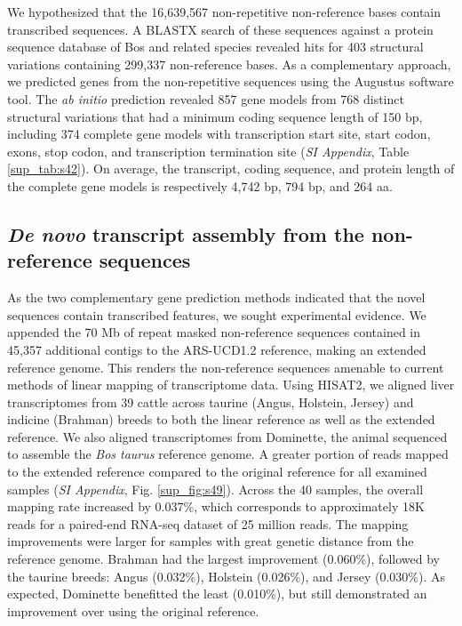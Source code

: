 \documentclass[../main.tex]{subfiles}
\begin{document}
We hypothesized that the 16,639,567 non-repetitive non-reference bases contain transcribed sequences. A BLASTX search of these sequences against a protein sequence database of Bos and related species revealed hits for 403 structural variations containing 299,337 non-reference bases. As a complementary approach, we predicted genes from the non-repetitive sequences using the Augustus software tool. The \emph{ab initio} prediction revealed 857 gene models from 768 distinct structural variations that had a minimum coding sequence length of 150 bp, including 374 complete gene models with transcription start site, start codon, exons, stop codon, and transcription termination site (\emph{SI Appendix}, Table \ref{sup_tab:s42}). On average, the transcript, coding sequence, and protein length of the complete gene models is respectively 4,742 bp, 794 bp, and 264 aa. 

\subsection*{\emph{De novo} transcript assembly from the non-reference sequences}

As the two complementary gene prediction methods indicated that the novel sequences contain transcribed features, we sought experimental evidence. We appended the 70 Mb of repeat masked non-reference sequences contained in 45,357 additional contigs to the ARS-UCD1.2 reference, making an extended reference genome. This renders the non-reference sequences amenable to current methods of linear mapping of transcriptome data. Using HISAT2, we aligned liver transcriptomes from 39 cattle across taurine (Angus, Holstein, Jersey) and indicine (Brahman) breeds to both the linear reference as well as the extended reference. We also aligned transcriptomes from Dominette, the animal sequenced to assemble the \emph{Bos taurus} reference genome. A greater portion of reads mapped to the extended reference compared to the original reference for all examined samples (\emph{SI Appendix}, Fig. \ref{sup_fig:s49}). Across the 40 samples, the overall mapping rate increased by 0.037\%, which corresponds to approximately 18K reads for a paired-end RNA-seq dataset of 25 million reads. The mapping improvements were larger for samples with great genetic distance from the reference genome. Brahman had the largest improvement (0.060\%), followed by the taurine breeds: Angus (0.032\%), Holstein (0.026\%), and Jersey (0.030\%). As expected, Dominette benefitted the least (0.010\%), but still demonstrated an improvement over using the original reference. 
\end{document}
